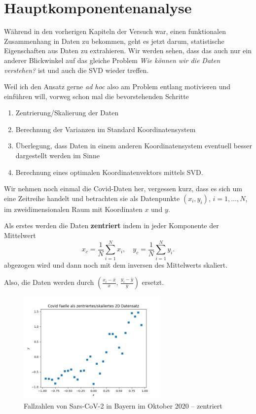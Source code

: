 \documentclass[]{book}
\providecommand{\tightlist}{%
  \setlength{\itemsep}{0pt}\setlength{\parskip}{0pt}}
\theoremstyle{definition}
\theoremstyle{definition}
\theoremstyle{definition}
\theoremstyle{definition}
\theoremstyle{remark}
\begin{document}
\hypertarget{hauptkomponentenanalyse}{%
\chapter{Hauptkomponentenanalyse}\label{hauptkomponentenanalyse}}

Während in den vorherigen Kapiteln der Versuch war, einen funktionalen Zusammenhang in Daten zu bekommen, geht es jetzt darum, statistische Eigenschaften aus Daten zu extrahieren. Wir werden sehen, dass das auch nur ein anderer Blickwinkel auf das gleiche Problem \emph{Wie können wir die Daten verstehen?} ist und auch die SVD wieder treffen.

Weil ich den Ansatz gerne \emph{ad hoc} also am Problem entlang motivieren und einführen will, vorweg schon mal die bevorstehenden Schritte

\begin{enumerate}
\def\labelenumi{\arabic{enumi}.}
\tightlist
\item
  Zentrierung/Skalierung der Daten
\item
  Berechnung der Varianzen im Standard Koordinatensystem
\item
  Überlegung, dass Daten in einem anderen Koordinatensystem eventuell besser dargestellt werden im Sinne
\item
  Berechnung eines optimalen Koordinatenvektors mittels SVD.
\end{enumerate}

Wir nehmen noch einmal die Covid-Daten her, vergessen kurz, dass es sich um eine Zeitreihe handelt und betrachten sie als Datenpunkte \((x_i, y_i)\), \(i=1,\dotsc,N\), im zweidimensionalen Raum mit Koordinaten \(x\) und \(y\).

Als erstes werden die Daten \textbf{zentriert} indem in jeder Komponente der Mittelwert
\begin{equation*}
x_c = \frac 1N \sum_{i=1}^N x_i,
\quad
y_c = \frac 1N \sum_{i=1}^N y_i.
\end{equation*}
abgezogen wird und dann noch mit dem inversen des Mittelwerts skaliert.

Also, die Daten werden durch \((\frac{x_i-\bar x}{\bar x},\, \frac{y_i-\bar y}{\bar y})\) ersetzt.

\begin{figure}
\hypertarget{fig:cases-cntrd}{%
\centering
\includegraphics[width=0.65\textwidth,height=\textheight]{bilder/04-covid-cntrd.png}
\caption{Fallzahlen von Sars-CoV-2 in Bayern im Oktober
2020 -- zentriert}\label{fig:cases-cntrd}
}
\end{figure}
\end{document}
